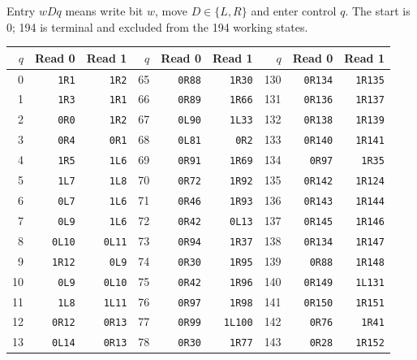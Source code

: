 Entry $wDq$ means write bit $w$, move $D\in\{L,R\}$ and enter control $q$.
The start is 0; 194 is terminal and excluded from the 194 working states.
\begin{center}\fontsize{7.6}{9.0}\selectfont
\setlength{\tabcolsep}{6pt}
\begin{tabular}{rrr@{\hspace{17pt}}rrr@{\hspace{17pt}}rrr}
\toprule
$q$ & Read 0 & Read 1 & $q$ & Read 0 & Read 1 & $q$ & Read 0 & Read 1\\
\midrule
0 & \texttt{1R1} & \texttt{1R2} & 65 & \texttt{0R88} & \texttt{1R30} & 130 & \texttt{0R134} & \texttt{1R135}\\
1 & \texttt{1R3} & \texttt{1R1} & 66 & \texttt{0R89} & \texttt{1R66} & 131 & \texttt{0R136} & \texttt{1R137}\\
2 & \texttt{0R0} & \texttt{1R2} & 67 & \texttt{0L90} & \texttt{1L33} & 132 & \texttt{0R138} & \texttt{1R139}\\
3 & \texttt{0R4} & \texttt{0R1} & 68 & \texttt{0L81} & \texttt{0R2} & 133 & \texttt{0R140} & \texttt{1R141}\\
4 & \texttt{1R5} & \texttt{1L6} & 69 & \texttt{0R91} & \texttt{1R69} & 134 & \texttt{0R97} & \texttt{1R35}\\
5 & \texttt{1L7} & \texttt{1L8} & 70 & \texttt{0R72} & \texttt{1R92} & 135 & \texttt{0R142} & \texttt{1R124}\\
6 & \texttt{0L7} & \texttt{1L6} & 71 & \texttt{0R46} & \texttt{1R93} & 136 & \texttt{0R143} & \texttt{1R144}\\
7 & \texttt{0L9} & \texttt{1L6} & 72 & \texttt{0R42} & \texttt{0L13} & 137 & \texttt{0R145} & \texttt{1R146}\\
8 & \texttt{0L10} & \texttt{0L11} & 73 & \texttt{0R94} & \texttt{1R37} & 138 & \texttt{0R134} & \texttt{1R147}\\
9 & \texttt{1R12} & \texttt{0L9} & 74 & \texttt{0R30} & \texttt{1R95} & 139 & \texttt{0R88} & \texttt{1R148}\\
10 & \texttt{0L9} & \texttt{0L10} & 75 & \texttt{0R42} & \texttt{1R96} & 140 & \texttt{0R149} & \texttt{1L131}\\
11 & \texttt{1L8} & \texttt{1L11} & 76 & \texttt{0R97} & \texttt{1R98} & 141 & \texttt{0R150} & \texttt{1R151}\\
12 & \texttt{0R12} & \texttt{0R13} & 77 & \texttt{0R99} & \texttt{1L100} & 142 & \texttt{0R76} & \texttt{1R41}\\
13 & \texttt{0L14} & \texttt{0R13} & 78 & \texttt{0R30} & \texttt{1R77} & 143 & \texttt{0R28} & \texttt{1R152}\\

\end{tabular}
\end{center}
